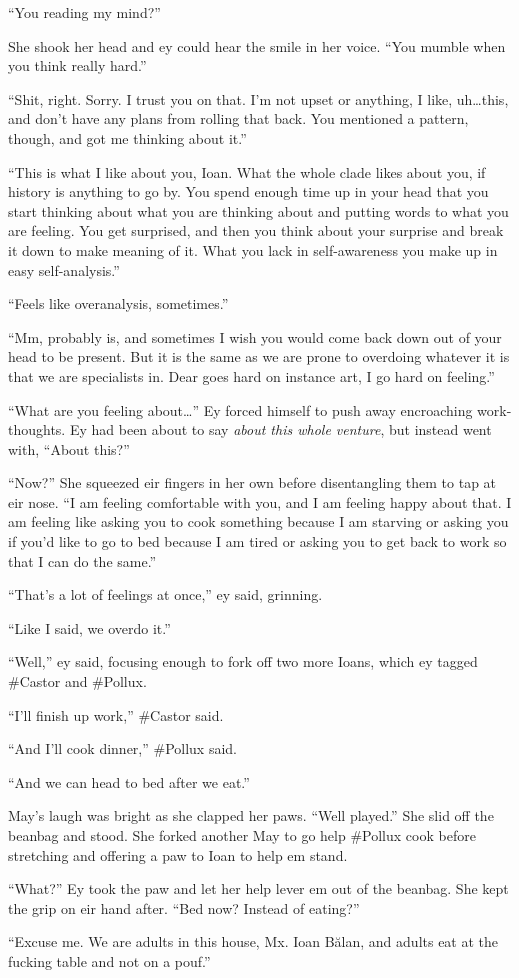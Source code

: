 ``You reading my mind?''

She shook her head and ey could hear the smile in her voice. ``You mumble when you think really hard.''

``Shit, right. Sorry. I trust you on that. I'm not upset or anything, I like, uh\ldots this, and don't have any plans from rolling that back. You mentioned a pattern, though, and got me thinking about it.''

``This is what I like about you, Ioan. What the whole clade likes about you, if history is anything to go by. You spend enough time up in your head that you start thinking about what you are thinking about and putting words to what you are feeling. You get surprised, and then you think about your surprise and break it down to make meaning of it. What you lack in self-awareness you make up in easy self-analysis.''

``Feels like overanalysis, sometimes.''

``Mm, probably is, and sometimes I wish you would come back down out of your head to be present. But it is the same as we are prone to overdoing whatever it is that we are specialists in. Dear goes hard on instance art, I go hard on feeling.''

``What are you feeling about\ldots{}'' Ey forced himself to push away encroaching work-thoughts. Ey had been about to say \emph{about this whole venture}, but instead went with, ``About this?''

``Now?'' She squeezed eir fingers in her own before disentangling them to tap at eir nose. ``I am feeling comfortable with you, and I am feeling happy about that. I am feeling like asking you to cook something because I am starving or asking you if you'd like to go to bed because I am tired or asking you to get back to work so that I can do the same.''

``That's a lot of feelings at once,'' ey said, grinning.

``Like I said, we overdo it.''

``Well,'' ey said, focusing enough to fork off two more Ioans, which ey tagged \#Castor and \#Pollux.

``I'll finish up work,'' \#Castor said.

``And I'll cook dinner,'' \#Pollux said.

``And we can head to bed after we eat.''

May's laugh was bright as she clapped her paws. ``Well played.'' She slid off the beanbag and stood. She forked another May to go help \#Pollux cook before stretching and offering a paw to Ioan to help em stand.

``What?'' Ey took the paw and let her help lever em out of the beanbag. She kept the grip on eir hand after. ``Bed now? Instead of eating?''

``Excuse me. We are adults in this house, Mx. Ioan Bălan, and adults eat at the fucking table and not on a pouf.''
